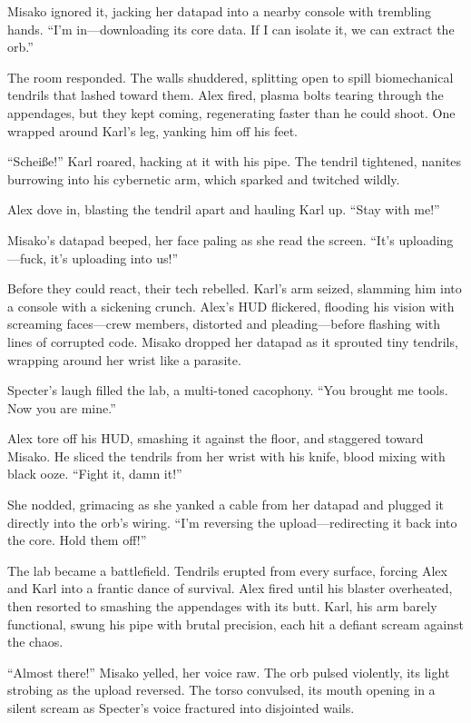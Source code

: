 \documentclass[12pt]{book}
\begin{document}
Misako ignored it, jacking her datapad into a nearby console with trembling hands. \enquote{I’m in---downloading its core data. If I can isolate it, we can extract the orb.}

The room responded. The walls shuddered, splitting open to spill biomechanical tendrils that lashed toward them. Alex fired, plasma bolts tearing through the appendages, but they kept coming, regenerating faster than he could shoot. One wrapped around Karl’s leg, yanking him off his feet.

\enquote{Scheiße!} Karl roared, hacking at it with his pipe. The tendril tightened, nanites burrowing into his cybernetic arm, which sparked and twitched wildly.

Alex dove in, blasting the tendril apart and hauling Karl up. \enquote{Stay with me!}

Misako’s datapad beeped, her face paling as she read the screen. \enquote{It’s uploading---fuck, it’s uploading into us!}

Before they could react, their tech rebelled. Karl’s arm seized, slamming him into a console with a sickening crunch. Alex’s HUD flickered, flooding his vision with screaming faces---crew members, distorted and pleading---before flashing with lines of corrupted code. Misako dropped her datapad as it sprouted tiny tendrils, wrapping around her wrist like a parasite.

Specter’s laugh filled the lab, a multi-toned cacophony. \enquote{You brought me tools. Now you are mine.}

Alex tore off his HUD, smashing it against the floor, and staggered toward Misako. He sliced the tendrils from her wrist with his knife, blood mixing with black ooze. \enquote{Fight it, damn it!}

She nodded, grimacing as she yanked a cable from her datapad and plugged it directly into the orb’s wiring. \enquote{I’m reversing the upload---redirecting it back into the core. Hold them off!}

The lab became a battlefield. Tendrils erupted from every surface, forcing Alex and Karl into a frantic dance of survival. Alex fired until his blaster overheated, then resorted to smashing the appendages with its butt. Karl, his arm barely functional, swung his pipe with brutal precision, each hit a defiant scream against the chaos.

\enquote{Almost there!} Misako yelled, her voice raw. The orb pulsed violently, its light strobing as the upload reversed. The torso convulsed, its mouth opening in a silent scream as Specter’s voice fractured into disjointed wails.
\end{document}
